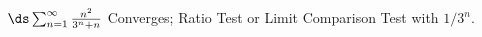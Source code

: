 {$\ds\sum_{n=1}^\infty \frac{n^2}{3^n+n}$
}
{Converges; Ratio Test or Limit Comparison Test with $1/3^n$.
}